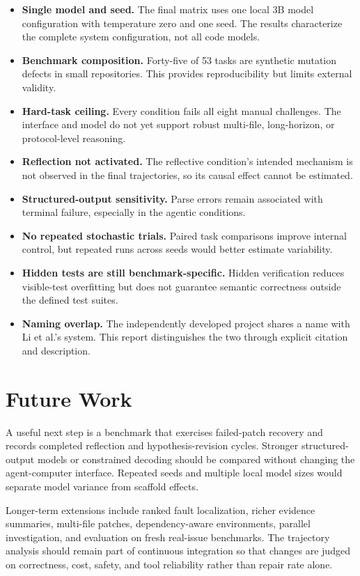 \documentclass[11pt,a4paper]{article}
\begin{document}
\begin{itemize}
  \item \textbf{Single model and seed.} The final matrix uses one local
  3B model configuration with temperature zero and one seed. The results
  characterize the complete system configuration, not all code models.
  \item \textbf{Benchmark composition.} Forty-five of 53 tasks are synthetic
  mutation defects in small repositories. This provides reproducibility but
  limits external validity.
  \item \textbf{Hard-task ceiling.} Every condition fails all eight manual
  challenges. The interface and model do not yet support robust multi-file,
  long-horizon, or protocol-level reasoning.
  \item \textbf{Reflection not activated.} The reflective condition's intended
  mechanism is not observed in the final trajectories, so its causal effect
  cannot be estimated.
  \item \textbf{Structured-output sensitivity.} Parse errors remain associated with terminal failure, especially in the
  agentic conditions.
  \item \textbf{No repeated stochastic trials.} Paired task comparisons improve
  internal control, but repeated runs across seeds would better estimate
  variability.
  \item \textbf{Hidden tests are still benchmark-specific.} Hidden verification
  reduces visible-test overfitting but does not guarantee semantic correctness
  outside the defined test suites.
  \item \textbf{Naming overlap.} The independently developed project shares a name with Li et al.'s system.
  This report distinguishes the two through explicit citation and description.
\end{itemize}

\section{Future Work}

A useful next step is a benchmark that exercises failed-patch recovery and
records completed reflection and hypothesis-revision cycles. Stronger structured-output
models or constrained decoding should be compared without changing the
agent-computer interface. Repeated seeds and multiple local model sizes would
separate model variance from scaffold effects.

Longer-term extensions include ranked fault localization, richer evidence
summaries, multi-file patches, dependency-aware environments, parallel
investigation, and evaluation on fresh real-issue benchmarks. The trajectory
analysis should remain part of continuous integration so that changes are judged
on correctness, cost, safety, and tool reliability rather than repair rate
alone.
\end{document}
